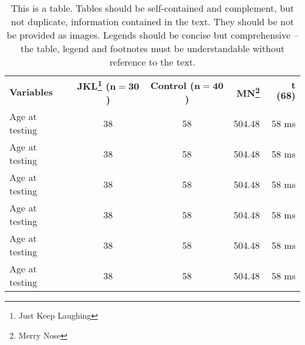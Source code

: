 \begin{table}
\caption{This is a table. Tables should be self-contained and complement, but not duplicate, information contained in the text. They should be not be provided as images. Legends should be concise but comprehensive – the table, legend and footnotes must be understandable without reference to the text.}
\begin{tabular}{lccrr}
\hline
\textbf{Variables} & \textbf{JKL\footnote{Just Keep Laughing} ($\boldsymbol{n=30}$)} & \textbf{Control ($\boldsymbol{n=40}$)} & \textbf{MN\footnote{Merry Nose}} & \textbf{$\boldsymbol t$ (68)}\\
Age at testing & 38 & 58 & 504.48 & 58 ms\\
Age at testing & 38 & 58 & 504.48 & 58 ms\\
Age at testing & 38 & 58 & 504.48 & 58 ms\\
Age at testing & 38 & 58 & 504.48 & 58 ms\\
Age at testing & 38 & 58 & 504.48 & 58 ms\\
Age at testing & 38 & 58 & 504.48 & 58 ms\\
\hline  
\end{tabular}
\end{table}
